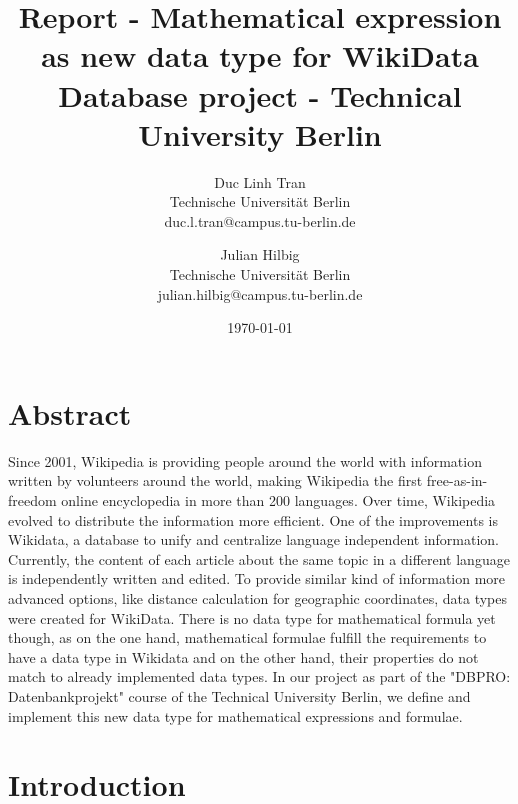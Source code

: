 \documentclass[12pt]{article}
\title{Report - Mathematical expression as new data type for WikiData\\
Database project - Technical University Berlin}
\date{\today}
\author{Duc Linh Tran\\ Technische Universität Berlin\\ duc.l.tran@campus.tu-berlin.de
       \and Julian Hilbig\\ Technische Universität Berlin\\ julian.hilbig@campus.tu-berlin.de}
\begin{document}
\maketitle

\section{Abstract}
Since 2001, Wikipedia is providing people around the world with information written by volunteers around the world, making Wikipedia the first  free-as-in-freedom online encyclopedia in more than 200 languages. Over time, Wikipedia evolved to distribute the information more efficient. One of the improvements is Wikidata, a database to unify and centralize language independent information. Currently, the content of each article about the same topic in a different language is independently written and edited. To provide similar kind of information more advanced options, like distance calculation for geographic coordinates, data types were created for WikiData. There is no data type for mathematical formula yet though, as on the one hand, mathematical formulae fulfill the requirements to have a data type in Wikidata and on the other hand, their properties do not match to already implemented data types. In our project as part of the "DBPRO: Datenbankprojekt" course of the Technical University Berlin, we define and implement this new data type for mathematical expressions and formulae.

\section{Introduction}
\end{document}
